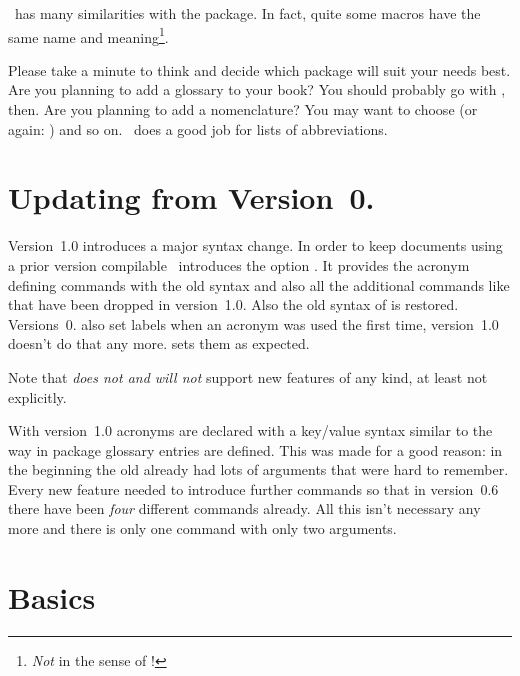 \documentclass[load-preamble+,scrartcl={DIV10}]{cnltx-doc}
\makeatletter
\newcommand\versionstar{\texorpdfstring{\@versionstar}{*}}
\makeatother
\begin{document}
\acro\ has many similarities with the  package.  In fact, quite
some macros have the same name and meaning\footnote{\emph{Not} in the sense of
  !}.

Please take a minute to think and decide which package will suit your needs
best.  Are you planning to add a glossary to your book?  You should probably
go with , then.  Are you planning to add a nomenclature?  You
may want to choose  (or again: ) and so on.
\acro\ does a good job for lists of abbreviations.

\section{Updating from Version~0.\versionstar}
Version~1.0 introduces a major syntax change.  In order to keep documents
using a prior version compilable \acro\ introduces the option
.  It provides the acronym defining commands with the old
syntax and also all the additional commands like 
that have been dropped in version~1.0.  Also the old syntax of
 is restored.  Versions~0.\versionstar{} also set labels
when an acronym was used the first time, version~1.0 doesn't do that any more.
 sets them as expected.

Note that  \emph{does not and will not} support new features
of any kind, at least not explicitly.

With version~1.0 acronyms are declared with a key/value syntax similar to the
way in package  glossary entries are defined.  This was made
for a good reason: in the beginning the old  already had
lots of arguments that were hard to remember.  Every new feature needed to
introduce further commands so that in version~0.6 there have been \emph{four}
different commands already.  All this isn't necessary any more and there is
only one command with only two arguments.

\section{Basics}
\end{document}
